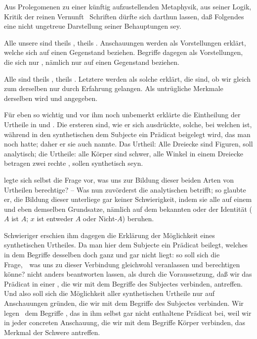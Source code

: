 Aus  Prolegomenen zu einer künftig aufzustellenden Metaphysik, aus seiner Logik, Kritik der reinen Vernunft \uma\  Schriften dürfte sich darthun lassen, daß Folgendes eine nicht ungetreue Darstellung seiner Behauptungen sey.
\begin{aufza}
\item Alle unsere  sind theils , theils . Anschauungen werden als Vorstellungen erklärt, welche sich  auf einen Gegenstand beziehen. Begriffe dagegen als Vorstellungen, die sich nur , nämlich nur  auf einen Gegenstand beziehen.
\item Alle  sind theils , theils  . Letztere werden als solche erklärt, die  sind, ob wir gleich zum  derselben nur durch Erfahrung gelangen. Als untrügliche Merkmale derselben wird  und  angegeben.
\item Für eben so wichtig und vor ihm noch unbemerkt erklärte  die Eintheilung der Urtheile in  und . Die ersteren sind, wie er sich ausdrückte, solche, bei welchen  ist, während in den synthetischen dem Subjecte ein Prädicat beigelegt wird, das man noch  hatte; daher er sie auch  nannte. Das Urtheil: Alle Dreiecke sind Figuren, soll analytisch; die Urtheile: alle Körper sind schwer, alle Winkel in einem Dreiecke betragen zwei rechte \udgl , sollen synthetisch seyn.
\item {} legte sich selbst die Frage vor, was uns zur Bildung dieser beiden Arten von Urtheilen berechtige? -- Was nun zuvörderst die analytischen betrifft; so glaubte er, die Bildung dieser unterliege gar keiner Schwierigkeit, indem sie alle auf einem und eben demselben Grundsatze, nämlich auf dem bekannten  oder der Identität ($A$ ist $A$; $x$ ist entweder $A$ oder Nicht-$A$) beruhen.
\item Schwieriger erschien ihm dagegen die Erklärung der Möglichkeit eines synthetischen Urtheiles. Da man hier dem Subjecte ein Prädicat beilegt, welches in dem Begriffe desselben doch ganz und gar nicht liegt: so soll sich die Frage,~\ was uns zu dieser Verbindung gleichwohl veranlassen und berechtigen könne? nicht anders beantworten lassen, als durch die Voraussetzung, daß wir das Prädicat in einer , die wir mit dem Begriffe des Subjectes verbinden, antreffen. Und also soll sich die Möglichkeit aller synthetischen Urtheile nur auf Anschauungen gründen, die wir mit dem Begriffe des Subjectes verbinden. Wir legen \zB\ dem Begriffe , das in ihm selbst gar nicht enthaltene Prädicat  bei, weil wir in jeder concreten Anschauung, die wir mit dem Begriffe Körper verbinden, das Merkmal der Schwere antreffen.

\end{aufza}

